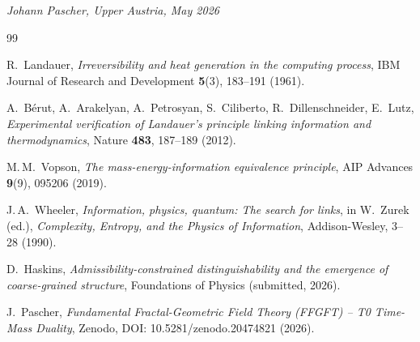 \bigskip
\begin{flushright}
\textit{Johann Pascher, Upper Austria, May 2026}
\end{flushright}

\begin{thebibliography}{99}

R.~Landauer,
\textit{Irreversibility and heat generation in the computing process},
IBM Journal of Research and Development \textbf{5}(3), 183--191 (1961).

A.~Bérut, A.~Arakelyan, A.~Petrosyan, S.~Ciliberto,
R.~Dillenschneider, E.~Lutz,
\textit{Experimental verification of Landauer's principle linking
information and thermodynamics},
Nature \textbf{483}, 187--189 (2012).

M.\,M.~Vopson,
\textit{The mass-energy-information equivalence principle},
AIP Advances \textbf{9}(9), 095206 (2019).

J.\,A.~Wheeler,
\textit{Information, physics, quantum: The search for links},
in W.~Zurek (ed.), \textit{Complexity, Entropy, and the Physics
of Information}, Addison-Wesley, 3--28 (1990).

D.~Haskins,
\textit{Admissibility-constrained distinguishability and the emergence
of coarse-grained structure},
Foundations of Physics (submitted, 2026).

J.~Pascher,
\textit{Fundamental Fractal-Geometric Field Theory (FFGFT) --
T0 Time-Mass Duality},
Zenodo, DOI: 10.5281/zenodo.20474821 (2026).

\end{thebibliography}
